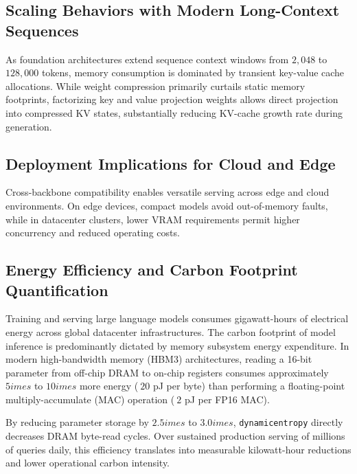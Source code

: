 \subsection{Scaling Behaviors with Modern Long-Context Sequences}
As foundation architectures extend sequence context windows from $2{,}048$ to $128{,}000$ tokens, memory consumption is dominated by transient key-value cache allocations. While weight compression primarily curtails static memory footprints, factorizing key and value projection weights allows direct projection into compressed KV states, substantially reducing KV-cache growth rate during generation.

\subsection{Deployment Implications for Cloud and Edge}
Cross-backbone compatibility enables versatile serving across edge and cloud environments. On edge devices, compact models avoid out-of-memory faults, while in datacenter clusters, lower VRAM requirements permit higher concurrency and reduced operating costs.

\subsection{Energy Efficiency and Carbon Footprint Quantification}
Training and serving large language models consumes gigawatt-hours of electrical energy across global datacenter infrastructures. The carbon footprint of model inference is predominantly dictated by memory subsystem energy expenditure. In modern high-bandwidth memory (HBM3) architectures, reading a 16-bit parameter from off-chip DRAM to on-chip registers consumes approximately $5	imes$ to $10	imes$ more energy ($~20$ pJ per byte) than performing a floating-point multiply-accumulate (MAC) operation ($~2$ pJ per FP16 MAC).

By reducing parameter storage by $2.5	imes$ to $3.0	imes$, \texttt{dynamicentropy} directly decreases DRAM byte-read cycles. Over sustained production serving of millions of queries daily, this efficiency translates into measurable kilowatt-hour reductions and lower operational carbon intensity.
